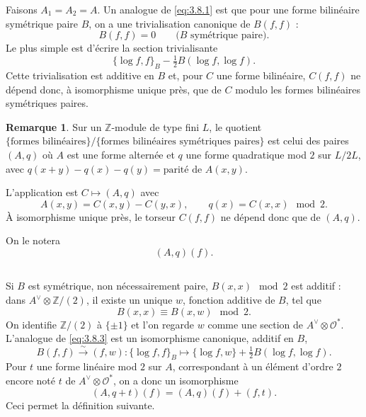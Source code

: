 \documentclass[12pt,a4paper]{article}
\theoremstyle{plain}
\theoremstyle{definition}
\newtheorem{remark}[theorem]{Remarque}
\theoremstyle{remark}
\newcommand{\cO}{\mathcal{O}}
\newcommand{\Z}{\mathbb{Z}}
\providecommand{\cO}{\mathcal{O}}
\begin{document}
Faisons $A_1 = A_2 = A$. Un analogue de \eqref{eq:3.8.1} est que pour une forme bilinéaire
symétrique paire $B$, on a une trivialisation canonique de $B(f,f)$ :
\begin{equation}\label{eq:3.10.3}
B(f,f) = 0 \qquad \text{($B$ symétrique paire)}.
\end{equation}
Le plus simple est d'écrire la section trivialisante
\begin{equation}\label{eq:3.10.4}
\{\log f, f\}_B - \tfrac{1}{2} B(\log f, \log f).
\end{equation}
Cette trivialisation est additive en $B$ et, pour $C$ une forme bilinéaire, $C(f,f)$ ne
dépend donc, à isomorphisme unique près, que de $C$ modulo les formes bilinéaires symétriques paires.

\begin{remark}
Sur un $\Z$-module de type fini $L$, le quotient $\{\text{formes bilinéaires}\}/\{\text{formes bilinéaires symétriques paires}\}$ est celui des paires $(A, q)$ où $A$ est une forme alternée et $q$ une forme
quadratique mod $2$ sur $L/2L$, avec $q(x+y) - q(x) - q(y) = \text{parité de } A(x,y)$.

L'application est $C \mapsto (A, q)$ avec
\[
A(x,y) = C(x,y) - C(y,x), \qquad q(x) = C(x,x) \mod 2.
\]
À isomorphisme unique près, le torseur $C(f,f)$ ne dépend donc que de $(A, q)$.

On le notera
\[
(A, q)(f).
\]
\end{remark}

\subsection{}

Si $B$ est symétrique, non nécessairement paire, $B(x,x) \mod 2$ est additif :
dans $A^\vee \otimes \Z/(2)$, il existe un unique $w$, fonction additive de $B$, tel que
\[
B(x,x) \equiv B(x, w) \mod 2.
\]
On identifie $\Z/(2)$ à $\{\pm 1\}$ et l'on regarde $w$ comme une section de $A^\vee \otimes \cO^*$. L'analogue
de \eqref{eq:3.8.3} est un isomorphisme canonique, additif en $B$,
\begin{equation}\label{eq:3.11.1}
B(f,f) \xrightarrow{\sim} (f, w) : \{\log f, f\}_B \mapsto \{\log f, w\} + \tfrac{1}{2} B(\log f, \log f).
\end{equation}
Pour $t$ une forme linéaire mod $2$ sur $A$, correspondant à un élément d'ordre $2$ encore
noté $t$ de $A^\vee \otimes \cO^*$, on a donc un isomorphisme
\[
(A, q + t)(f) = (A, q)(f) + (f, t).
\]
Ceci permet la définition suivante.
\end{document}
